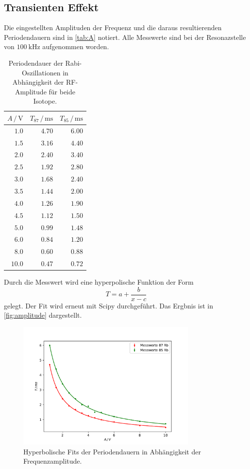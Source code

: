 \subsection{Transienten Effekt}
\label{ssec:transient}

Die eingestellten Amplituden der Frequenz und die daraus resultierenden Periodendauern sind in \autoref{tab:A} notiert.
Alle Messwerte sind bei der Resonazstelle von $\qty{100}{\kilo\hertz}$ aufgenommen worden.
\begin{table}
    \centering
    \caption{Periodendauer der Rabi-Oszillationen in Abhängigkeit der RF-Amplitude für beide Isotope.}
    \label{tab:A}
    \begin{tabular}{r r r}
        \toprule
        $A \,/\, \unit{\volt}$ & $T_\text{87} \,/\, \unit{\milli\second}$ & $T_\text{85} \,/\, \unit{\milli\second}$\\
        \midrule
        $1.0 $ & $4.70 $ & $6.00 $\\
        $1.5 $ & $3.16 $ & $4.40 $\\
        $2.0 $ & $2.40 $ & $3.40 $\\
        $2.5 $ & $1.92 $ & $2.80 $\\
        $3.0 $ & $1.68 $ & $2.40 $\\
        $3.5 $ & $1.44 $ & $2.00 $\\
        $4.0 $ & $1.26 $ & $1.90 $\\
        $4.5 $ & $1.12 $ & $1.50 $\\
        $5.0 $ & $0.99 $ & $1.48 $\\
        $6.0 $ & $0.84 $ & $1.20 $\\
        $8.0 $ & $0.60 $ & $0.88 $\\
        $10.0$ & $ 0.47$ & $0.72 $\\
        \bottomrule
    \end{tabular}
\end{table}
Durch die Messwert wird eine hyperpolische Funktion der Form
\begin{equation*}
    T = a + \frac{b}{x - c}
\end{equation*}
gelegt. 
Der Fit wird erneut mit Scipy durchgeführt.
Das Ergbnis ist in \autoref{fig:amplitude} dargestellt.
\begin{figure}
    \centering
    \includegraphics[width=0.8\textwidth]{plots/amplitude.pdf}
    \caption{Hyperbolische Fits der Periodendauern in Abhängigkeit der Frequenzamplitude.}
    \label{fig:amplitude}
\end{figure}
